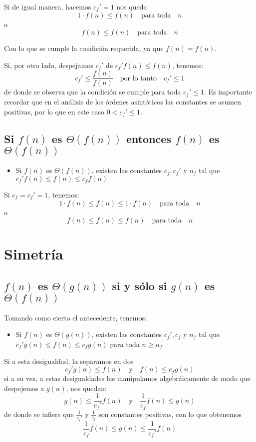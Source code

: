 \documentclass[letterpaper, 12pt]{article}
\begin{document}
\noindent
Si de igual manera, hacemos \(c_f' = 1\) nos queda:
$$
1 \cdot f(n) \leq f(n) \quad \mbox{para toda} \quad n
$$
o
$$
f(n) \leq f(n) \quad \mbox{para toda} \quad n
$$

\noindent
Con lo que se cumple la condición requerida, ya que \(f(n) = f(n)\).

\noindent
Si, por otro lado, despejamos \(c_f'\) de \(c_f' f(n) \leq f(n)\), tenemos:
$$
c_f' \leq \frac{f(n)}{f(n)} \quad \mbox{por lo tanto} \quad c_f' \leq 1
$$
de donde se observa que la condición se cumple para toda \(c_f' \leq 1\). Es
importante recordar que en el análisis de los órdenes asintóticos las constantes
se asumen positivas, por lo que en este caso \(0 < c_f' \leq 1\).
\subsection{Si \(f(n)\) es \(\Theta(f(n))\) entonces \(f(n)\) es \(\Theta(f(n))\)}
\label{sec:orgdb0c2ff}
\begin{itemize}
\item Si \(f(n)\) es \(\Theta(f(n))\), existen las constantes \(c_f, c_f'\) y \(n_f\) tal
que \(c_f' f(n) \leq f(n) \leq c_f f(n)\)
\end{itemize}

\noindent
Si \(c_f = c_f' = 1\), tenemos:
$$
1 \cdot f(n) \leq f(n) \leq 1 \cdot f(n) \quad \mbox{para toda} \quad n
$$
o
$$
f(n) \leq f(n) \leq f(n) \quad \mbox{para toda} \quad n
$$
\section{Simetría}
\label{sec:org389def5}
\subsection{\(f(n)\) es \(\Theta(g(n))\) si y sólo si \(g(n)\) es \(\Theta(f(n))\)}
\label{sec:org792f820}
Tomando como cierto el antecedente, tenemos:
\begin{itemize}
\item Si \(f(n)\) es \(\Theta(g(n))\), existen las constantes \(c_f', c_f\) y \(n_f\) tal
que \(c_f' g(n) \leq f(n) \leq c_f g(n)\) para toda \(n \geq n_f\)
\end{itemize}

\noindent
Si a esta desigualdad, la separamos en dos
$$
c_f' g(n) \leq f(n) \quad \mbox{y} \quad f(n) \leq c_f g(n)
$$
si a su vez, a estas desigualdades las manipulamos algebráicamente de modo que
despejemos a \(g(n)\), nos quedan:
$$
g(n) \leq \frac{1}{c_f'} f(n) \quad \mbox{y} \quad \frac{1}{c_f} f(n) \leq g(n)
$$
de donde se infiere que \(\frac{1}{c_f'}\) y \(\frac{1}{c_f}\) son constantes
positivas, con lo que obtenemos
$$
\frac{1}{c_f} f(n) \leq g(n) \leq \frac{1}{c_f'} f(n)
$$
\end{document}
